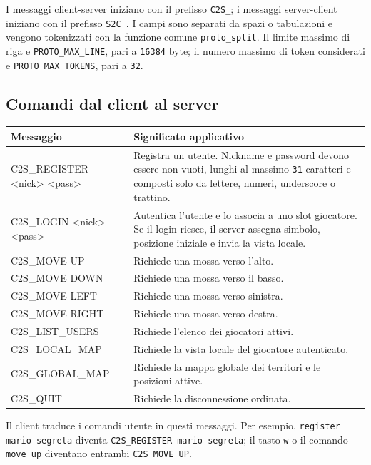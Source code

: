 \documentclass[11pt,a4paper]{article}
\begin{document}
I messaggi client-server iniziano con il prefisso \texttt{C2S\_}; i messaggi server-client iniziano con il prefisso \texttt{S2C\_}. I campi sono separati da spazi o tabulazioni e vengono tokenizzati con la funzione comune \texttt{proto\_split}. Il limite massimo di riga e \texttt{PROTO\_MAX\_LINE}, pari a \texttt{16384} byte; il numero massimo di token considerati e \texttt{PROTO\_MAX\_TOKENS}, pari a \texttt{32}.

\subsection{Comandi dal client al server}

\begin{longtable}{>{\ttfamily}p{5.6cm}p{8.2cm}}
\toprule
\normalfont\textbf{Messaggio} & \textbf{Significato applicativo} \\
\midrule
\endhead

C2S\_REGISTER \textless nick\textgreater{} \textless pass\textgreater{} & Registra un utente. Nickname e password devono essere non vuoti, lunghi al massimo \texttt{31} caratteri e composti solo da lettere, numeri, underscore o trattino. \\
C2S\_LOGIN \textless nick\textgreater{} \textless pass\textgreater{} & Autentica l'utente e lo associa a uno slot giocatore. Se il login riesce, il server assegna simbolo, posizione iniziale e invia la vista locale. \\
C2S\_MOVE UP & Richiede una mossa verso l'alto. \\
C2S\_MOVE DOWN & Richiede una mossa verso il basso. \\
C2S\_MOVE LEFT & Richiede una mossa verso sinistra. \\
C2S\_MOVE RIGHT & Richiede una mossa verso destra. \\
C2S\_LIST\_USERS & Richiede l'elenco dei giocatori attivi. \\
C2S\_LOCAL\_MAP & Richiede la vista locale del giocatore autenticato. \\
C2S\_GLOBAL\_MAP & Richiede la mappa globale dei territori e le posizioni attive. \\
C2S\_QUIT & Richiede la disconnessione ordinata. \\

\bottomrule
\end{longtable}

Il client traduce i comandi utente in questi messaggi. Per esempio, \texttt{register mario segreta} diventa \texttt{C2S\_REGISTER mario segreta}; il tasto \texttt{w} o il comando \texttt{move up} diventano entrambi \texttt{C2S\_MOVE UP}.
\end{document}
